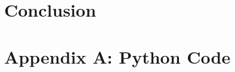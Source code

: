 \documentclass[twocolumn,10pt]{asme2ej}
\begin{document}
\section{Conclusion}

\nocite{*}



\clearpage
\onecolumn
\appendix       %
\section*{Appendix A: Python Code}




\end{document}
